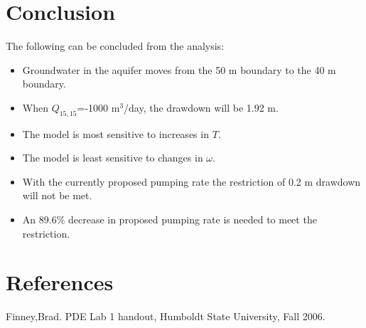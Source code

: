 \documentclass[titlepage,11pt]{article}
\begin{document}
\section{Conclusion}
The following can be concluded from the analysis:
\begin{itemize}
\item{Groundwater in the aquifer moves from the 50 m boundary to the 40 m boundary.}
\item{When $Q_{15,15}$=-1000 m$^3$/day, the drawdown  will be 1.92 m.}
\item{The model is most sensitive to increases in $T$.}
\item{The model is least sensitive to changes in $\omega$.}
\item{With the currently proposed pumping rate the restriction of 0.2 m drawdown will not be met.}
\item{An 89.6\% decrease in proposed pumping rate is needed to meet the restriction.}
\end{itemize}

\section{References}
\noindent Finney,Brad. PDE Lab 1 handout, Humboldt State University,
Fall 2006.
\end{document}
